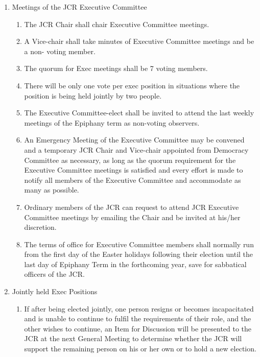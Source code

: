 \begin{enumerate}
    \item Meetings of the JCR Executive Committee
    \begin{enumerate}
        \item The JCR Chair shall chair Executive Committee meetings.
        \item A Vice-chair shall take minutes of Executive Committee meetings and be a non- voting member.
        \item The quorum for Exec meetings shall be 7 voting members.
        \item There will be only one vote per exec position in situations where the position is being held jointly by two people.
        \item The Executive Committee-elect shall be invited to attend the last weekly meetings of the Epiphany term as non-voting observers.
        \item An Emergency Meeting of the Executive Committee may be convened and a temporary JCR Chair and Vice-chair appointed from Democracy Committee as necessary, as long as the quorum requirement for the Executive Committee meetings is satisfied and every effort is made to notify all members of the Executive Committee and accommodate as many as possible.
        \item Ordinary members of the JCR can request to attend JCR Executive Committee meetings by emailing the Chair and be invited at his/her discretion.
        \item The terms of office for Executive Committee members shall normally run from the first day of the Easter holidays following their election until the last day of Epiphany Term in the forthcoming year, save for sabbatical officers of the JCR. 
    \end{enumerate}
    \item Jointly held Exec Positions
    \begin{enumerate}
        \item If after being elected jointly, one person resigns or becomes incapacitated and is unable to continue to fulfil the requirements of their role, and the other wishes to continue, an Item for Discussion will be presented to the JCR at the next General Meeting to determine whether the JCR will support the remaining person on his or her own or to hold a new election.
    \end{enumerate}

\end{enumerate}
